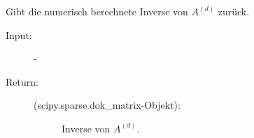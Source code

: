 \documentclass[letterpaper,10pt,ngerman, oneside, openright]{sphinxmanual}
\begin{document}
\begin{fulllineitems}
\begin{fulllineitems}
\begin{description}
\begin{description}
\end{description}

\end{description}

\end{fulllineitems}


\begin{fulllineitems}
\label{\detokenize{index:sparse_erw.Sparse.return_mat_d_inv}}
Gibt die numerisch berechnete Inverse von $A^{(d)}$ zurück.

\begin{description}
\item [{Input:}] -
\end{description}
\begin{description}
\item[{Return:}] \leavevmode\begin{description}
\item[{(scipy.sparse.dok\_matrix-Objekt):}] \leavevmode
Inverse von $A^{(d)}$.

\end{description}

\end{description}

\end{fulllineitems}


\end{fulllineitems}
\end{document}
